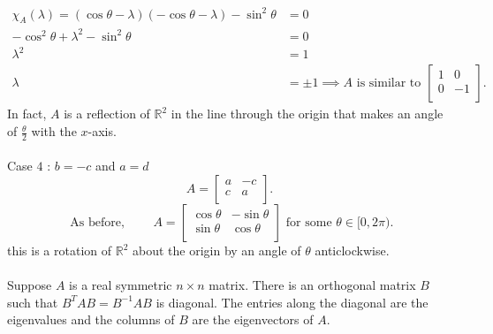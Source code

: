 \documentclass{report}
\begin{document}
 \begin{align*}
  \chi _A \left( \lambda \right) = \left( \cos \theta  -\lambda \right) \left( - \cos \theta - \lambda  \right) - \sin ^2 \theta &= 0\\
  - \cos ^2 \theta + \lambda ^2 - \sin ^2 \theta &= 0\\
  \lambda ^2 &= 1\\
  \lambda &= \pm 1
  \implies A \text{ is similar to } \begin{bmatrix}
  1 & 0\\
  0 & -1\\
  \end{bmatrix}
 .\end{align*}
 In fact, $ A$ is a reflection of $ \mathbb{R} ^2$ in the line through the origin that makes an angle of $  \frac{\theta}{2}$ with the $ x$-axis. \\
 \\
 Case $ 4$ : $ b = -c$ and $ a = d$\\
 \[
 A = \begin{bmatrix}
 a & -c\\
 c & a\\
 \end{bmatrix} 
 .\] 
 \[
 \text{ As before, } \qquad  A = \begin{bmatrix}
  \cos \theta  & - \sin \theta \\
 \sin \theta  & \cos \theta \\
 \end{bmatrix} \text{ for some } \theta \in [0, 2\pi)
 .\] 
 this is a rotation of $ \mathbb{R} ^2$ about the origin by an angle of $ \theta$ anticlockwise. \\
 \\
 {
   Suppose $ A$ is a real symmetric $n \times n$  matrix. There is an orthogonal matrix $ B$ such that $ B ^{ T}A B = B ^{-1}A B$ is diagonal. The entries along the diagonal are the eigenvalues and the columns of $ B$ are the eigenvectors of $ A$. \\
 }
\end{document}

